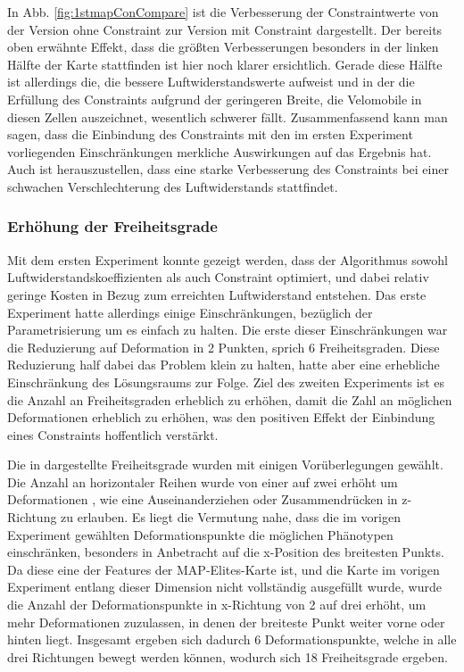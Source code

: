 In Abb. \ref{fig:1stmapConCompare} ist die Verbesserung der Constraintwerte von der Version ohne Constraint zur Version mit Constraint dargestellt.
Der bereits oben erwähnte Effekt, dass die größten Verbesserungen besonders in der linken Hälfte der Karte stattfinden ist hier noch klarer ersichtlich.
Gerade diese Hälfte ist allerdings die, die bessere Luftwiderstandswerte aufweist und in der die Erfüllung des Constraints aufgrund der geringeren Breite, die Velomobile in diesen Zellen auszeichnet, wesentlich schwerer fällt.
Zusammenfassend kann man sagen, dass die Einbindung des Constraints mit den im ersten Experiment vorliegenden Einschränkungen merkliche Auswirkungen auf das Ergebnis hat.
Auch ist herauszustellen, dass eine starke Verbesserung des Constraints bei einer schwachen Verschlechterung des Luftwiderstands stattfindet.

\subsubsection{Erhöhung der Freiheitsgrade}

Mit dem ersten Experiment konnte gezeigt werden, dass der Algorithmus sowohl Luftwiderstandskoeffizienten als auch Constraint optimiert, und dabei relativ geringe Kosten in Bezug zum erreichten Luftwiderstand entstehen.
Das erste Experiment hatte allerdings einige Einschränkungen, bezüglich der Parametrisierung um es einfach zu halten.
Die erste dieser Einschränkungen war die Reduzierung auf Deformation in 2 Punkten, sprich 6 Freiheitsgraden.
Diese Reduzierung half dabei das Problem klein zu halten, hatte aber eine erhebliche Einschränkung des Lösungsraums zur Folge.
Ziel des zweiten Experiments ist es die Anzahl an Freiheitsgraden erheblich zu erhöhen, damit die Zahl an möglichen Deformationen erheblich zu erhöhen, was den positiven Effekt der Einbindung eines Constraints hoffentlich verstärkt.

Die in \todo{} dargestellte Freiheitsgrade wurden mit einigen Vorüberlegungen gewählt.
Die Anzahl an horizontaler Reihen wurde von einer auf zwei erhöht um Deformationen , wie eine Auseinanderziehen oder Zusammendrücken in z-Richtung zu erlauben.
Es liegt die Vermutung nahe, dass die im vorigen Experiment gewählten Deformationspunkte die möglichen Phänotypen einschränken, besonders in Anbetracht auf die x-Position des breitesten Punkts.
Da diese eine der Features der MAP-Elites-Karte ist, und die Karte im vorigen Experiment entlang dieser Dimension nicht vollständig ausgefüllt wurde, wurde die Anzahl der Deformationspunkte in x-Richtung von 2 auf drei erhöht, um mehr Deformationen zuzulassen, in denen der breiteste Punkt weiter vorne oder hinten liegt.
Insgesamt ergeben sich dadurch 6 Deformationspunkte, welche in alle drei Richtungen bewegt werden können, wodurch sich 18 Freiheitsgrade ergeben.

